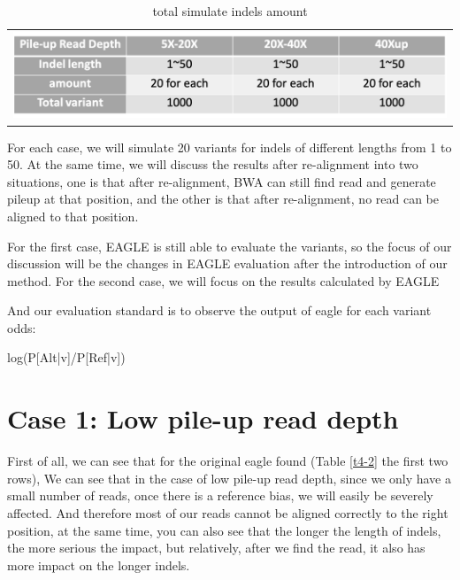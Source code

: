 \vspace{0.5cm}
\begin{table}[h]
    \centering
    \caption[total indels amount]{total simulate indels amount}
    \vspace{-0.5cm}
    \begin{tabular}{c}
        \includegraphics[width=1\textwidth]{body/image/t4-1.png}
    \end{tabular}
    \label{t4-1}
\end{table}

For each case, we will simulate 20 variants for indels of different lengths from 1 to 50. At the same time, we will discuss the results after re-alignment into two situations, one is that after re-alignment, BWA can still find read and generate pileup at that position, and the other is that after re-alignment, no read can be aligned to that position.

For the first case, EAGLE is still able to evaluate the variants, so the focus of our discussion will be the changes in EAGLE evaluation after the introduction of our method. For the second case, we will focus on the results calculated by EAGLE
\begin{flushleft}
And our evaluation standard is to observe the output of eagle for each variant odds:  
\end{flushleft}
\begin{center}
    log⁡(P[Alt|v]/P[Ref|v])
\end{center}

\section{Case 1: Low pile-up read depth}

First of all, we can see that for the original eagle found (Table \ref{t4-2} the first two rows), We can see that in the case of low pile-up read depth, since we only have a small number of reads, once there is a reference bias, we will easily be severely affected. And therefore most of our reads cannot be aligned correctly to the right position, at the same time, you can also see that the longer the length of indels, the more serious the impact, but relatively, after we find the read, it also has more impact on the longer indels.

